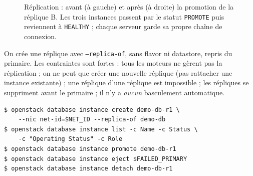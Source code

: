 \begin{figure}[!ht]
\centering
{}
\caption{Réplication : avant (à gauche) et après (à droite) la promotion de la réplique B. Les trois instances passent par le statut
\texttt{PROMOTE} puis reviennent à \texttt{HEALTHY} ; chaque serveur garde sa propre chaîne de connexion.}
\label{fig:tr-repl}
\end{figure}

On crée une réplique avec \texttt{--replica-of}, sans flavor ni datastore, repris du primaire. Les contraintes sont fortes
\parencite{trove-replication} : tous les moteurs ne gèrent pas la réplication ; on ne peut que créer une nouvelle réplique (pas
rattacher une instance existante) ; une réplique d'une réplique est impossible ; les répliques se suppriment avant le primaire ; il
n'y a \emph{aucun} basculement automatique.

\par\noindent\begin{minipage}{\linewidth}
\begin{lstlisting}[style=terminal]
$ openstack database instance create demo-db-r1 \
    --nic net-id=$NET_ID --replica-of demo-db
$ openstack database instance list -c Name -c Status \
    -c "Operating Status" -c Role
$ openstack database instance promote demo-db-r1
$ openstack database instance eject $FAILED_PRIMARY
$ openstack database instance detach demo-db-r1
\end{lstlisting}
\end{minipage}\par

